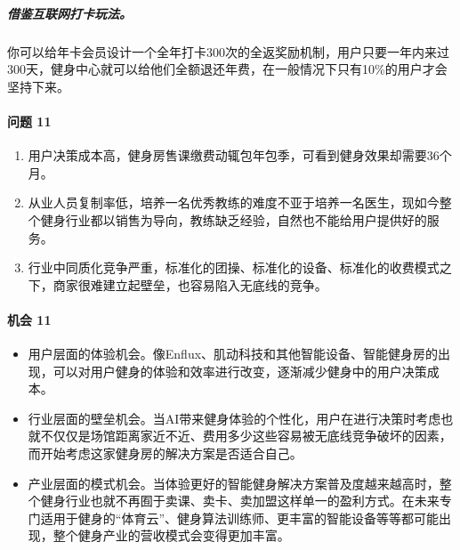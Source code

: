 \documentclass[letterpaper,11pt,english]{sphinxmanual}
\begin{document}
\subparagraph{借鉴互联网打卡玩法。}
\label{\detokenize{chapter_project/AI_fit:id17}}
你可以给年卡会员设计一个全年打卡300次的全返奖励机制，用户只要一年内来过300天，健身中心就可以给他们全额退还年费，在一般情况下只有10\%的用户才会坚持下来。


\paragraph{问题 11\sphinxfootnotemark[709]}
\label{\detokenize{chapter_project/AI_fit:id18}}%
\begin{footnotetext}[709]\sphinxAtStartFootnote
{}
%
\end{footnotetext}\ignorespaces \begin{enumerate}
%
\item {} 
用户决策成本高，健身房售课缴费动辄包年包季，可看到健身效果却需要3\sphinxhyphen{}6个月。

\item {} 
从业人员复制率低，培养一名优秀教练的难度不亚于培养一名医生，现如今整个健身行业都以销售为导向，教练缺乏经验，自然也不能给用户提供好的服务。

\item {} 
行业中同质化竞争严重，标准化的团操、标准化的设备、标准化的收费模式之下，商家很难建立起壁垒，也容易陷入无底线的竞争。

\end{enumerate}


\paragraph{机会 11\sphinxfootnotemark[710]}
\label{\detokenize{chapter_project/AI_fit:id19}}%
\begin{footnotetext}[710]\sphinxAtStartFootnote
{}
%
\end{footnotetext}\ignorespaces \begin{itemize}
\item {} 
用户层面的体验机会。像Enflux、肌动科技和其他智能设备、智能健身房的出现，可以对用户健身的体验和效率进行改变，逐渐减少健身中的用户决策成本。

\item {} 
行业层面的壁垒机会。当AI带来健身体验的个性化，用户在进行决策时考虑也就不仅仅是场馆距离家近不近、费用多少这些容易被无底线竞争破坏的因素，而开始考虑这家健身房的解决方案是否适合自己。

\item {} 
产业层面的模式机会。当体验更好的智能健身解决方案普及度越来越高时，整个健身行业也就不再囿于卖课、卖卡、卖加盟这样单一的盈利方式。在未来专门适用于健身的“体育云”、健身算法训练师、更丰富的智能设备等等都可能出现，整个健身产业的营收模式会变得更加丰富。

\end{itemize}
\end{document}
